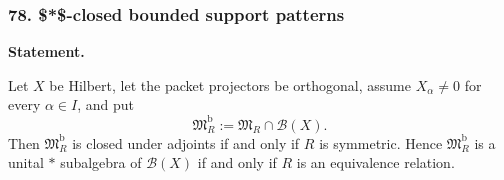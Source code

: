 \subsubsection*{78. \$*\$-closed bounded support patterns}
\label{rec:PSC-I-C-SUPPORT-PATTERN-STAR}
\textbf{Statement.}\par
Let $X$ be Hilbert, let the packet projectors be orthogonal, assume $X_\alpha\neq0$ for every $\alpha\in I$, and put
\[
\mathfrak M_R^{\mathrm b}:=\mathfrak M_R\cap\mathcal B(X).
\]
Then $\mathfrak M_R^{\mathrm b}$ is closed under adjoints if and only if $R$ is symmetric.  Hence $\mathfrak M_R^{\mathrm b}$ is a unital $*$ subalgebra of $\mathcal B(X)$ if and only if $R$ is an equivalence relation.

